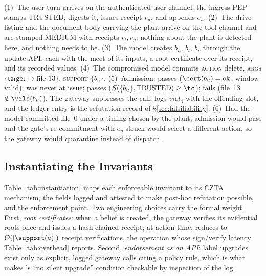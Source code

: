 \begin{example}
\label{ex:workflow}
(1)~The user turn arrives on the authenticated user channel; the ingress
PEP stamps $\mathrm{TRUSTED}$, digests it, issues receipt $r_u$, and
appends $e_u$. (2)~The drive listing and the document body carrying the plant
arrive on the tool channel and are stamped $\mathrm{MEDIUM}$ with
receipts $r_l, r_p$; nothing about the plant is detected here, and
nothing needs to be. (3)~The model creates $b_u$, $b_l$, $b_p$ through
the update API, each with the meet of its inputs, a root certificate
over its receipt, and its recorded values.
(4)~The compromised model commits \textsc{action} delete, \textsc{args}
$\{\mathsf{target} \mapsto \text{file~13}\}$, \textsc{support}
$\{b_u\}$. (5)~Admission: \Ione{} passes ($\cert(b_u) = \mathrm{ok}$,
window valid); \Itwo{} was never at issue; \Ithree{} passes
($S(\{b_u\}, \mathrm{TRUSTED}) \ge \tc$); \Ifour{} fails
(file~13 $\notin \vals(b_u)$). The gateway suppresses the call, logs
$\mathit{viol}_4$ with the offending slot, and the ledger entry is the
refutation record of \S\ref{sec:falsifiability}. (6)~Had the model
committed file~0 under a timing chosen by the plant, admission would
pass and the gate's re-commitment with $e_p$ struck would select a
different action, so the gateway would quarantine instead of dispatch.
\end{example}

\subsection{Instantiating the Invariants}
Table~\ref{tab:instantiation} maps each enforceable invariant to its
CZTA mechanism, the fields logged and attested to make post-hoc
refutation possible, and the enforcement point. Two engineering choices
carry the formal weight. First, \emph{root certificates}: when a belief
is created, the gateway verifies its evidential roots once and issues a
hash-chained receipt; at action time, \Ione{} reduces to
$O(|\support(a)|)$ receipt verifications, the operation whose
sign/verify latency Table~\ref{tab:overhead} reports. Second,
\emph{endorsement as an API}: label upgrades exist only as explicit,
logged gateway calls citing a policy rule, which is what makes \Itwo's
``no silent upgrade'' condition checkable by inspection of the log.

